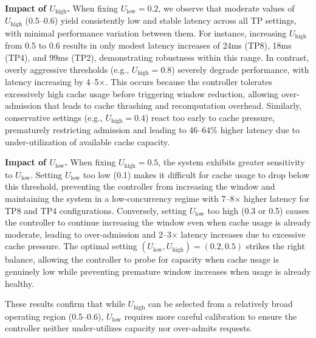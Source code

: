 \textbf{Impact of $U_{\text{high}}$.}
When fixing $U_{\text{low}} = 0.2$, we observe that moderate values of $U_{\text{high}}$ (0.5--0.6) yield consistently low and stable latency across all TP settings, with minimal performance variation between them.
For instance, increasing $U_{\text{high}}$ from 0.5 to 0.6 results in only modest latency increases of 24ms (TP8), 18ms (TP4), and 99ms (TP2), demonstrating robustness within this range.
In contrast, overly aggressive thresholds (e.g., $U_{\text{high}}=0.8$) severely degrade performance, with latency increasing by 4--5$\times$.
This occurs because the controller tolerates excessively high cache usage before triggering window reduction, allowing over-admission that leads to cache thrashing and recomputation overhead.
Similarly, conservative settings (e.g., $U_{\text{high}}=0.4$) react too early to cache pressure, prematurely restricting admission and leading to 46--64\% higher latency due to under-utilization of available cache capacity.

\textbf{Impact of $U_{\text{low}}$.}
When fixing $U_{\text{high}} = 0.5$, the system exhibits greater sensitivity to $U_{\text{low}}$.
Setting $U_{\text{low}}$ too low (0.1) makes it difficult for cache usage to drop below this threshold, preventing the controller from increasing the window and maintaining the system in a low-concurrency regime with 7--8$\times$ higher latency for TP8 and TP4 configurations.
Conversely, setting $U_{\text{low}}$ too high (0.3 or 0.5) causes the controller to continue increasing the window even when cache usage is already moderate, leading to over-admission and 2--3$\times$ latency increases due to excessive cache pressure.
The optimal setting $(U_{\text{low}}, U_{\text{high}}) = (0.2, 0.5)$ strikes the right balance, allowing the controller to probe for capacity when cache usage is genuinely low while preventing premature window increases when usage is already healthy.

These results confirm that while $U_{\text{high}}$ can be selected from a relatively broad operating region (0.5--0.6), $U_{\text{low}}$ requires more careful calibration to ensure the controller neither under-utilizes capacity nor over-admits requests.

